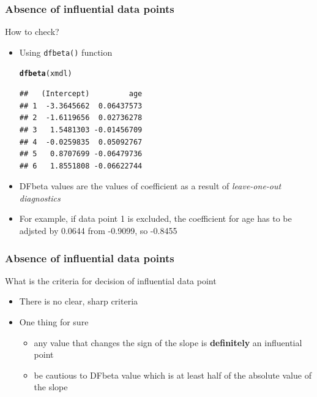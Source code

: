 \documentclass[10p]{beamer}\usepackage[]{graphicx}\usepackage[]{color}
\makeatletter
\newcommand{\hlstd}[1]{\textcolor[rgb]{0.345,0.345,0.345}{#1}}%
\newcommand{\hlkwd}[1]{\textcolor[rgb]{0.737,0.353,0.396}{\textbf{#1}}}%
\newenvironment{kframe}{%
 \def\at@end@of@kframe{}%
 \ifinner\ifhmode%
  \def\at@end@of@kframe{\end{minipage}}%
  \begin{minipage}{\columnwidth}%
 \fi\fi%
 \def\FrameCommand##1{\hskip\@totalleftmargin \hskip-\fboxsep
 \colorbox{shadecolor}{##1}\hskip-\fboxsep
     \hskip-\linewidth \hskip-\@totalleftmargin \hskip\columnwidth}%
 \MakeFramed {\advance\hsize-\width
   \@totalleftmargin\z@ \linewidth\hsize
   \@setminipage}}%
 {\par\unskip\endMakeFramed%
 \at@end@of@kframe}
\newenvironment{knitrout}{}{} %
\makeatother
\begin{document}
\begin{frame}[fragile]
\frametitle{Absence of influential data points}
How to check?
\begin{itemize}
\item Using \texttt{dfbeta()} function
\begin{knitrout}\scriptsize
{}\color{fgcolor}\begin{kframe}
\begin{alltt}
\hlkwd{dfbeta}\hlstd{(xmdl)}
\end{alltt}
\begin{verbatim}
##   (Intercept)         age
## 1  -3.3645662  0.06437573
## 2  -1.6119656  0.02736278
## 3   1.5481303 -0.01456709
## 4  -0.0259835  0.05092767
## 5   0.8707699 -0.06479736
## 6   1.8551808 -0.06622744
\end{verbatim}
\end{kframe}
\end{knitrout}
\item DFbeta values are the values of coefficient as a result of \textit{leave-one-out diagnostics}
\item For example, if data point 1 is excluded, the coefficient for age has to be adjsted by 0.0644 from -0.9099, so -0.8455
\end{itemize}
\end{frame}

\begin{frame}
\frametitle{Absence of influential data points}
What is the criteria for decision of influential data point
\begin{itemize}
\item There is no clear, sharp criteria
\item One thing for sure
	\begin{itemize}
	\item any value that changes the sign of the slope is \textbf{definitely} an influential point
	\item be cautious to DFbeta value which is at least half of the absolute value of the slope
	\end{itemize}
\end{itemize}
\end{frame}
\end{document}
